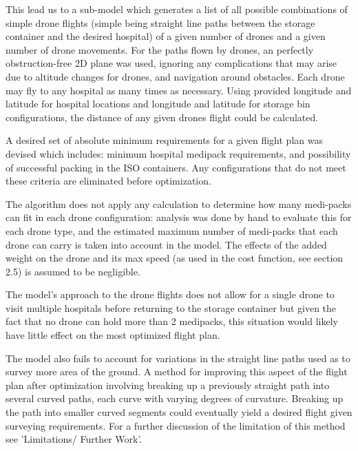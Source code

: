 \documentclass[twocolumn,10pt]{asme2ej}
\begin{document}
This lead us to a sub-model which generates a list of all possible combinations of simple drone flights (simple being straight line paths between the storage container and the desired hospital) of a given number of drones and a given number of drone movements. For the paths flown by drones, an perfectly obstruction-free 2D plane was used, ignoring any complications that may arise due to altitude changes for drones, and navigation around obstacles. Each drone may fly to any hospital as many times as necessary. Using provided longitude and latitude for hospital locations and longitude and latitude for storage bin configurations, the distance of any given drones flight could be calculated. 

A desired set of absolute minimum requirements for a given flight plan was devised which includes: minimum hospital medipack requirements, and possibility of successful packing in the ISO containers. Any configurations that do not meet these criteria are eliminated before optimization. 

The algorithm does not apply any calculation to determine how many medi-packs can fit in each drone configuration: analysis was done by hand to evaluate this for each drone type, and the estimated maximum number of medi-packs that each drone can carry is taken into account in the model. The effects of the added weight on the drone and its max speed (as used in the cost function, see section 2.5) is assumed to be negligible. 

The model's approach to the drone flights does not allow for a single drone to visit multiple hospitals before returning to the storage container but given the fact that no drone can hold more than 2 medipacks, this situation would likely have little effect on the most optimized flight plan. 

The model also fails to account for variations in the straight line paths used as to survey more area of the ground. A method for improving this aspect of the flight plan after optimization involving breaking up a previously straight path into several curved paths, each curve with varying degrees of curvature. Breaking up the path into smaller curved segments could eventually yield a desired flight given surveying requirements. For a further discussion of the limitation of this method see 'Limitations/ Further Work'.
\end{document}
